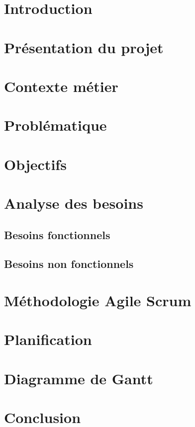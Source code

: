 \documentclass[12pt,a4paper,oneside]{report}
\begin{document}
\section{Introduction}

\section{Présentation du projet}

\section{Contexte métier}

\section{Problématique}

\section{Objectifs}

\section{Analyse des besoins}

\subsection{Besoins fonctionnels}

\subsection{Besoins non fonctionnels}

\section{Méthodologie Agile Scrum}

\section{Planification}

\section{Diagramme de Gantt}

\section{Conclusion}
\end{document}
